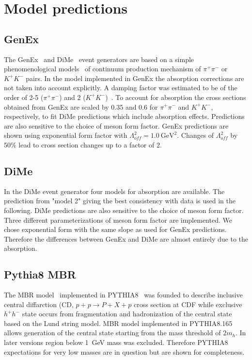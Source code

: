 \section{Model predictions}\label{sec:mcModelPred}

\subsection{GenEx}
The GenEx~\cite{GenEx} and DiMe~\cite{DurhamModel} event generators are based on a simple phenomenological models~\cite{LSmodel, LSModelKK, harland_lang_1} of continuum production mechanism of $\pi^+\pi^-$ or $K^+K^-$ pairs. In the model implemented in GenEx the absorption corrections are not taken into account explicitly. A damping factor was estimated to be of the order of 2-5 ($\pi^+\pi^-$) and 2 ($K^+K^-$)~\cite{LSAbsorption}. To account for absorption the cross sections obtained from GenEx are scaled by 0.35 and 0.6 for $\pi^+\pi^-$ and $K^+K^-$, respectively, to fit DiMe predictions which include absorption effects. Predictions are also sensitive to the choice of meson form factor. GenEx predictions are shown using exponential form factor with $\Lambda_{of\!f}^{2}=1.0~\textrm{GeV}^{2}$. Changes of $\Lambda_{of\!f}^{2}$ by 50\% lead to cross section changes up to a factor of 2.

\subsection{DiMe}
In the DiMe event generator four models for absorption are available. The prediction from "model 2" giving the best consistency with data is used in the following. DiMe predictions are also sensitive to the choice of meson form factor. Three different parameterizations of meson form factor are implemented. We chose exponential form with the same slope as used for GenEx predictions. Therefore the differences between GenEx and DiMe are almost entirely due to the absorption.

\subsection{Pythia8 MBR}
The MBR model~\cite{mbr_pythia8} implemented in PYTHIA8~\cite{pythia8} was founded to describe inclusive 
central diffarction (CD, $p+p\rightarrow P+X+p$ cross section 
at CDF while exclusive $h^+h^-$ state occurs from fragmentation and hadronization of the central state based on the Lund string model. MBR model implemented in PYTHIA8.165 allows generation of the central state starting from the mass threshold of $2 m_h$. In later versions region below 1~GeV mass was excluded. Therefore PYTHIA8 expectations for very low masses are in question but are shown for completeness.
